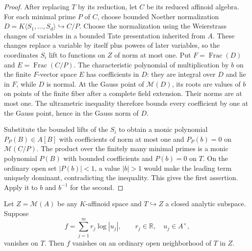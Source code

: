 \begin{proof}
After replacing $T$ by its reduction, let $C$ be its reduced affinoid algebra. For each minimal prime $P$ of $C$, choose bounded Noether normalization $D=K\langle S_1,\ldots,S_d\rangle\hookrightarrow C/P$. Choose the normalization using the Weierstrass changes of variables in a bounded Tate presentation inherited from $A$. These changes replace a variable by itself plus powers of later variables, so the coordinates $S_i$ lift to functions on $Z$ of norm at most one. Put $F=\operatorname{Frac}(D)$ and $E=\operatorname{Frac}(C/P)$. The characteristic polynomial of multiplication by $b$ on the finite $F$-vector space $E$ has coefficients in $D$: they are integral over $D$ and lie in $F$, while $D$ is normal. At the Gauss point of $\mathcal M(D)$, its roots are values of $b$ on points of the finite fiber after a complete field extension. Their norms are at most one. The ultrametric inequality therefore bounds every coefficient by one at the Gauss point, hence in the Gauss norm of $D$.

Substitute the bounded lifts of the $S_i$ to obtain a monic polynomial $P_P(B)\in A[B]$ with coefficients of norm at most one and $P_P(b)=0$ on $\mathcal M(C/P)$. The product over the finitely many minimal primes is a monic polynomial $P(B)$ with bounded coefficients and $P(b)=0$ on $T$. On the ordinary open set $|P(b)|<1$, a value $|b|>1$ would make the leading term uniquely dominant, contradicting the inequality. This gives the first assertion. Apply it to $b$ and $b^{-1}$ for the second.
\end{proof}

\begin{lemma}\label{lem:supplied-p061-real-log-tube}
Let $Z=\mathcal M(A)$ be any $K$-affinoid space and $T\hookrightarrow Z$ a closed analytic subspace. Suppose
\[
 f=\sum_{j=1}^{m}r_j\log|u_j|,\qquad r_j\in\mathbb R,\quad u_j\in A^\times,
\]
vanishes on $T$. Then $f$ vanishes on an ordinary open neighborhood of $T$ in $Z$.
\end{lemma}

